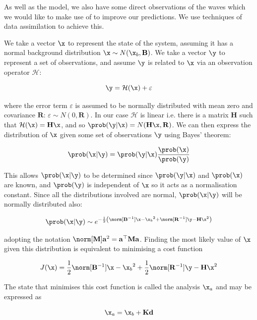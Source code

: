 As well as the model, we also have some direct observations of the waves which we would like to make use of to improve our predictions. We use techniques of data assimilation to achieve this.

We take a vector $\x$ to represent the state of the system, assuming it has a normal background distribution $\x \sim N(\x_b,\mathbf{B})$. We take a vector $\y$ to represent a set of observations, and assume $\y$ is related to $\x$ via an observation operator $\mathcal{H}$:

\[
\y = \mathcal{H}(\x) + \varepsilon
\]

where the error term $\varepsilon$ is assumed to be normally distributed with mean zero and covariance $\mathbf{R}$: $\varepsilon \sim N(0,\mathbf{R})$. In our case $\mathcal{H}$ is linear i.e. there is a matrix $\mathbf{H}$ such that $\mathcal{H}(\x) = \mathbf{H}\x$, and so $\prob(\y|\x) = N(\mathbf{H}\x,\mathbf{R})$. We can then express the distribution of $\x$ given some set of observations $\y$ using Bayes' theorem:

\begin{equation}
    \prob(\x|\y) = \prob(\y|\x) \frac{\prob(\x)}{\prob(\y)}
\end{equation}

This allows $\prob(\x|\y)$ to be determined since $\prob(\y|\x)$ and $\prob(\x)$ are known, and $\prob(\y)$ is independent of $\x$ so it acts as a normalisation constant. Since all the distributions involved are normal, $\prob(\x|\y)$ will be normally distributed also:

\begin{equation}
    \prob(\x|\y) \sim e^{-\frac 1 2 \left( \norm[\mathbf{B}^{-1}]{\x - \x_b}^2 + \norm[\mathbf{R}^{-1}]{\y - \mathbf{H}\x}^2\right)}
\end{equation}

adopting the notation $\norm[\mathbf{M}]{\mathbf{a}}^2 = \mathbf{a}^\top \mathbf{M} \mathbf{a}$. Finding the most likely value of $\x$ given this distribution is equivalent to minimising a cost function

\begin{equation}
    J(\x) = \frac 1 2 \norm[\mathbf{B}^{-1}]{\x - \x_b}^2 + \frac 1 2 \norm[\mathbf{R}^{-1}]{\y - \mathbf{H}\x}^2
    \label{eqn:cost3d}
\end{equation}

The state that minimises this cost function is called the analysis $\x_a$ and may be expressed as

\begin{equation}
    \x_a = \x_b + \mathbf{K}\mathbf{d}
\end{equation}

